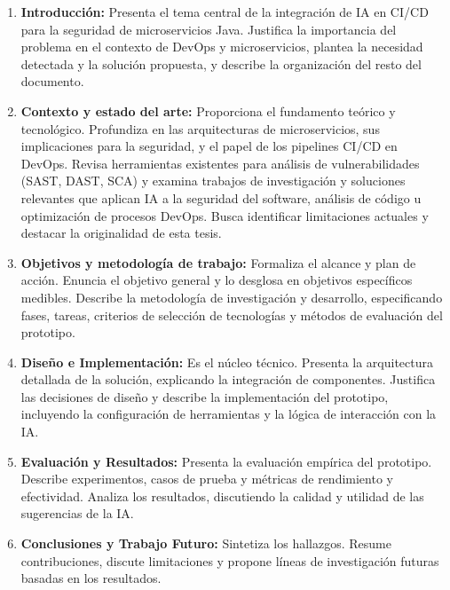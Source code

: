 \begin{enumerate}
\item \textbf{Introducción:} Presenta el tema central de la integración de IA en CI/CD para la seguridad de microservicios Java. Justifica la importancia del problema en el contexto de DevOps y microservicios, plantea la necesidad detectada y la solución propuesta, y describe la organización del resto del documento.

\item \textbf{Contexto y estado del arte:} Proporciona el fundamento teórico y tecnológico. Profundiza en las arquitecturas de microservicios, sus implicaciones para la seguridad, y el papel de los pipelines CI/CD en DevOps. Revisa herramientas existentes para análisis de vulnerabilidades (SAST, DAST, SCA) y examina trabajos de investigación y soluciones relevantes que aplican IA a la seguridad del software, análisis de código u optimización de procesos DevOps. Busca identificar limitaciones actuales y destacar la originalidad de esta tesis.

\item \textbf{Objetivos y metodología de trabajo:} Formaliza el alcance y plan de acción. Enuncia el objetivo general y lo desglosa en objetivos específicos medibles. Describe la metodología de investigación y desarrollo, especificando fases, tareas, criterios de selección de tecnologías y métodos de evaluación del prototipo.

\item \textbf{Diseño e Implementación:} Es el núcleo técnico. Presenta la arquitectura detallada de la solución, explicando la integración de componentes. Justifica las decisiones de diseño y describe la implementación del prototipo, incluyendo la configuración de herramientas y la lógica de interacción con la IA.

\item \textbf{Evaluación y Resultados:} Presenta la evaluación empírica del prototipo. Describe experimentos, casos de prueba y métricas de rendimiento y efectividad. Analiza los resultados, discutiendo la calidad y utilidad de las sugerencias de la IA.

\item \textbf{Conclusiones y Trabajo Futuro:} Sintetiza los hallazgos. Resume contribuciones, discute limitaciones y propone líneas de investigación futuras basadas en los resultados.
\end{enumerate}

